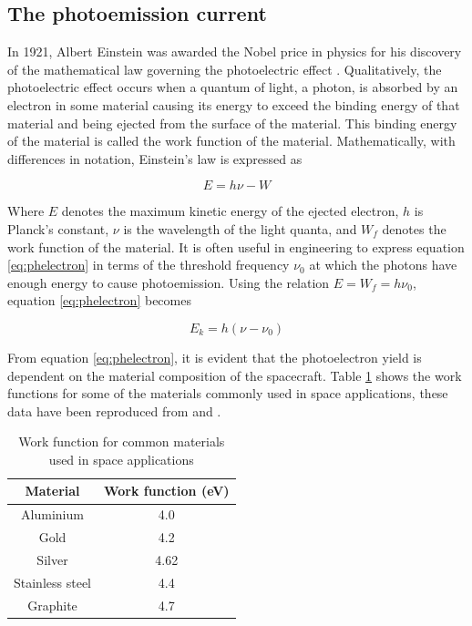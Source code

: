 \subsection*{The photoemission current}
In 1921, Albert Einstein was awarded the Nobel price in physics for his discovery of the mathematical law governing the photoelectric effect . Qualitatively, the photoelectric effect occurs when a quantum of light, a photon, is absorbed by an electron in some material causing its energy to exceed the binding energy of that material and being ejected from the surface of the material. This binding energy of the material is called the work function of the material. Mathematically, with differences in notation, Einstein's law is expressed as 

\begin{equation}\label{eq:phelectron}
    E = h \nu - W
\end{equation}

Where $E$ denotes the maximum kinetic energy of the ejected electron, $h$ is Planck's constant, $\nu$ is the wavelength of the light quanta, and $W_f$ denotes the work function of the material. It is often useful in engineering to express equation \ref{eq:phelectron} in terms of the threshold frequency $\nu_0$ at which the photons have enough energy to cause photoemission. Using the relation $E = W_f = h \nu_0$, equation \ref{eq:phelectron} becomes

\begin{equation}\label{eq:phfreq}
    E_{k} = h(\nu - \nu_0)
\end{equation}

From equation \ref{eq:phelectron}, it is evident that the photoelectron yield is dependent on the material composition of the spacecraft. Table \ref{tab:workfunc} shows the work functions for some of the materials commonly used in space applications, these data have been reproduced from  and .

\begin{table}[h!]
    \centering
    \begin{tabular}{|c|c|}
        \hline
        \textbf{Material} & \textbf{Work function (eV)} \\ \hline
        Aluminium         & 4.0                    \\ \hline
        Gold              & 4.2                    \\ \hline
        Silver            & 4.62                   \\ \hline
        Stainless steel   & 4.4                    \\ \hline
        Graphite          & 4.7                    \\ \hline
    \end{tabular}
    \caption{Work function for common materials used in space applications}
    \label{tab:workfunc}
\end{table}

